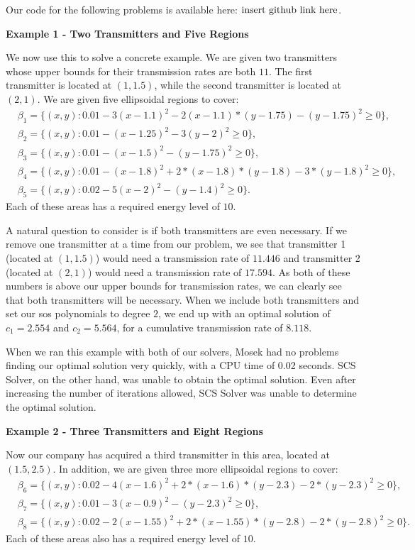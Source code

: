 	Our code for the following problems is available here: $\textnormal{insert github link here}$.
	
	\textbf{Example 1 - Two Transmitters and Five Regions}
	
	We now use this to solve a concrete example. We are given two transmitters whose upper bounds for their transmission rates are both $11$. The first transmitter is located at $(1, 1.5)$, while the second transmitter is located at $(2, 1)$. We are given five ellipsoidal regions to cover:
	$$
	\begin{aligned}
	&\beta_1 = \{(x,y) : 0.01-3(x-1.1)^2-2(x-1.1)*(y-1.75)-(y-1.75)^2 \geq 0\},\\
	&\beta_2 = \{(x,y) : 0.01-(x-1.25)^2-3(y-2)^2 \geq 0\},\\
	&\beta_3 = \{(x,y) : 0.01-(x-1.5)^2-(y-1.75)^2 \geq 0\},\\
	&\beta_4 = \{(x,y) : 0.01-(x-1.8)^2+2*(x-1.8)*(y-1.8)-3*(y-1.8)^2 \geq 0\},\\
	&\beta_5 = \{(x,y) : 0.02-5(x-2)^2-(y-1.4)^2 \geq 0\}.
	\end{aligned}
	$$
	Each of these areas has a required energy level of $10$. 
	
	A natural question to consider is if both transmitters are even necessary. If we remove one transmitter at a time from our problem, we see that transmitter 1 (located at $(1, 1.5)$) would need a transmission rate of $11.446$ and transmitter 2 (located at $(2,1)$) would need a transmission rate of $17.594$. As both of these numbers is above our upper bounds for transmission rates, we can clearly see that both transmitters will be necessary. When we include both transmitters and set our sos polynomials to degree $2$, we end up with an optimal solution of $c_1 = 2.554$ and $c_2  = 5.564$, for a cumulative transmission rate of $8.118$. 
	
	When we ran this example with both of our solvers, Mosek had no problems finding our optimal solution very quickly, with a CPU time of 0.02 seconds. SCS Solver, on the other hand, was unable to obtain the optimal solution. Even after increasing the number of iterations allowed, SCS Solver was unable to determine the optimal solution.  
	
	\textbf{Example 2 - Three Transmitters and Eight Regions}
	
	Now our company has acquired a third transmitter in this area, located at $(1.5, 2.5)$. In addition, we are given three more ellipsoidal regions to cover:
	$$
	\begin{aligned}
	&\beta_6 = \{(x,y) : 0.02-4(x-1.6)^2+2*(x-1.6)*(y-2.3)-2*(y-2.3)^2 \geq 0\},\\
	&\beta_7 = \{(x,y) : 0.01-3(x-0.9)^2-(y-2.3)^2 \geq 0\},\\
	&\beta_8 = \{(x,y) :0.02-2(x-1.55)^2+2*(x-1.55)*(y-2.8)-2*(y-2.8)^2 \geq 0\}.
	\end{aligned}
	$$
	Each of these areas also has a required energy level of $10$. 
	
